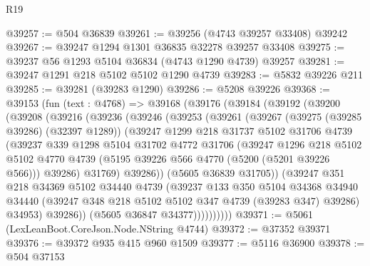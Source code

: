 \begin{lexlean}{R19}
\begin{coremodule}
{{{{{{{{{{{@39257 := @504 @36839
@39261 := @39256 (@4743 @39257 @33408) @39242
@39267 := @39247 @1294 @1301 @36835 @32278 @39257 @33408
@39275 := @39237 @56 @1293 @5104 @36834 (@4743 @1290 @4739) @39257
@39281 := @39247 @1291 @218 @5102 @5102 @1290 @4739
@39283 := @5832 @39226 @211
@39285 := @39281 (@39283 @1290)
@39286 := @5208 @39226
@39368 := @39153
    (fun (text : @4768) =>
    @39168
      (@39176
        (@39184
          (@39192
            (@39200
              (@39208
                (@39216
                  (@39236
                    (@39246
                      (@39253
                        (@39261
                          (@39267
                            (@39275 (@39285 @39286) (@32397 @1289))
                            (@39247
                              @1299
                              @218
                              @31737
                              @5102
                              @31706
                              @4739
                              (@39237
                                @339
                                @1298
                                @5104
                                @31702
                                @4772
                                @31706
                                (@39247
                                  @1296
                                  @218
                                  @5102
                                  @5102
                                  @4770
                                  @4739
                                  (@5195 @39226 @566 @4770 (@5200 (@5201 @39226 @566)))
                                  @39286)
                                @31769)
                              @39286))
                          (@5605 @36839 @31705))
                        (@39247
                          @351
                          @218
                          @34369
                          @5102
                          @34440
                          @4739
                          (@39237
                            @133
                            @350
                            @5104
                            @34368
                            @34940
                            @34440
                            (@39247 @348 @218 @5102 @5102 @347 @4739 (@39283 @347) @39286)
                            @34953)
                          @39286))
                      (@5605 @36847 @34377))))))))))
@39371 := @5061 (LexLeanBoot.CoreJson.Node.NString @4744)
@39372 := @37352 @39371
@39376 := @39372 @935 @415 @960 @1509
@39377 := @5116 @36900
@39378 := @504 @37153
}}}}}}}}}}}
\end{coremodule}
\end{lexlean}

